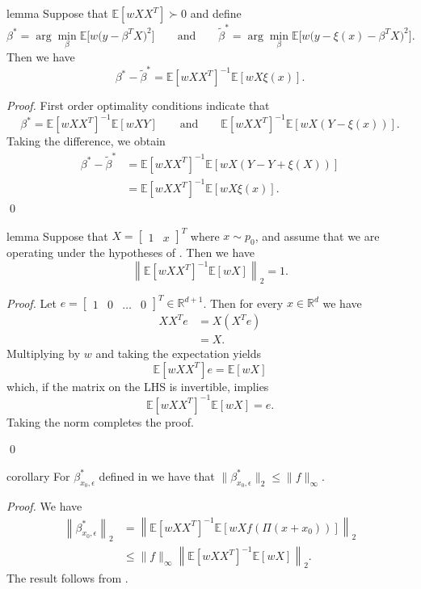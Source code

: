 \documentclass[11pt]{article}
\begin{document}
\begin{restatable}[Perturbation]{lemma}{} \label{lemma: perturbation}
    Suppose that $\mathbb{E}[wXX^T] \succ 0$ and define  
    \[\beta^* = \arg\min_{\beta}\mathbb{E}\big[w\big(y - \beta^{T}X\big)^2\big] \qquad \text{and} \qquad \tilde{\beta}^* = \arg\min_{\beta}\mathbb{E}\big[w\big(y - \xi(x) - \beta^{T}X\big)^2\big].\]
    Then we have
    \[\beta^* - \tilde{\beta}^* = \mathbb{E}[wXX^{T}]^{-1}\mathbb{E}[wX\xi(x)].\]
\end{restatable}
\noindent \textit{Proof.} First order optimality conditions indicate that 
\[\beta^* = \mathbb{E}[wXX^{T}]^{-1}\mathbb{E}[wXY] \qquad \text{and} \qquad \mathbb{E}[wXX^{T}]^{-1}\mathbb{E}[wX(Y - \xi(x))].\]
Taking the difference, we obtain
\begin{align*}
    \beta^* - \tilde{\beta}^* &= \mathbb{E}[wXX^{T}]^{-1}\mathbb{E}[wX(Y -  Y + \xi(X) )] \\
    &= \mathbb{E}[wXX^{T}]^{-1}\mathbb{E}[wX\xi(x)].
\end{align*}
\qed{}



\begin{restatable}{lemma}{} \label{lemma: pnorm bound} Suppose that $X = \begin{bmatrix}
    1 & x
\end{bmatrix}^T$ where $x \sim p_0$, and assume that we are operating under the hypotheses of . Then we have
\begin{equation}
   \left\|\mathbb{E}[wXX^{T}]^{-1}\mathbb{E}[wX]\right\|_2 =  1.
\end{equation}
\end{restatable}
\noindent \textit{Proof.} Let $e = \begin{bmatrix}
    1 & 0 & \dots & 0
\end{bmatrix}^T \in \mathbb{R}^{d+1}$. Then for every $x \in \mathbb{R}^d$ we have
\begin{align*}
    XX^Te &= X(X^Te) \\
    &= X.
\end{align*}
Multiplying by $w$ and taking the expectation yields
\[\mathbb{E}[wXX^T]e = \mathbb{E}[wX]\]
which, if the matrix on the LHS is invertible, implies
\[\mathbb{E}[wXX^T]^{-1}\mathbb{E}[wX] = e.\]
Taking the norm completes the proof.

\qed{}

\begin{restatable}{corollary}{} \label{corollary: population beta norm bound}
For $\beta^*_{x_0, \epsilon}$ defined in  we have that $\|\beta^*_{x_0, \epsilon}\|_2 \leq \|f\|_{\infty}$.     
\end{restatable}
\noindent \textit{Proof.} We have
\begin{align*}
    \left\|\beta^*_{x_0, \epsilon}\right\|_2 &= \left\|\mathbb{E}\left[wXX^T\right]^{-1}\mathbb{E}\left[wXf(\Pi(x+x_0))\right]\right\|_2 \\
    &\leq \|f\|_\infty \left\|\mathbb{E}\left[wXX^T\right]^{-1}\mathbb{E}\left[wX\right]\right\|_2.
\end{align*}
The result follows from .
\end{document}
